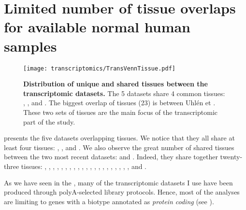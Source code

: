 

\section{Limited number of tissue overlaps for available normal human samples}

\begin{figure}%
\texttt{[image: transcriptomics/TransVennTissue.pdf]}\centering
\caption[Distribution of unique and shared tissues between the
transcriptomic datasets]
{\label{fig:VennStudiesT}\textbf{Distribution of unique and shared tissues
between the transcriptomic datasets.} The 5 datasets share 4
common tissues: , ,  and
. The biggest overlap of tissues (23) is between Uhlén et \Gtex.
These two sets of tissues are the main focus of the transcriptomic part of the
study.}
\end{figure}

 presents the five datasets overlapping tissues. We notice
that they all share at least four tissues: , ,
 and .
We also observe the great number of shared tissues between the two most recent
datasets:  and . Indeed, they share together twenty-three
tissues: , , ,
, , ,
, , , ,
, , , ,
, , ,
, , , ,
 and .

As we have seen in the ,
many of the transcriptomic datasets I use have been produced through
polyA-selected library protocols.
Hence, most of the analyses are limiting to genes with a biotype annotated as
\emph{protein coding} (see ).

